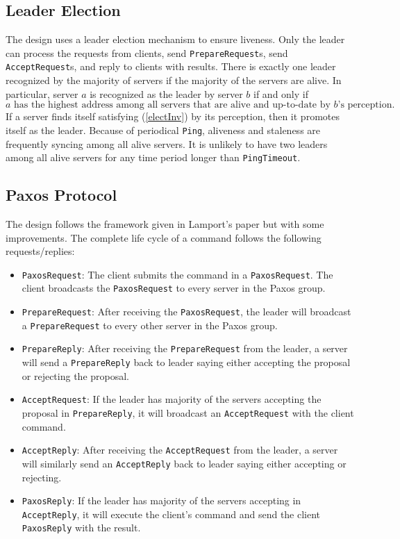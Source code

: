 \documentclass{article}
\numberwithin{equation}{section}
\begin{document}
\subsection{Leader Election}
The design uses a leader election mechanism to ensure liveness. Only the leader can process the requests from clients, send \verb|PrepareRequest|s, send \verb|AcceptRequest|s, and reply to clients with results. There is exactly one leader recognized by the majority of servers if the majority of the servers are alive. In particular, server $a$ is recognized as the leader by server $b$ if and only if
\begin{equation}\label{electInv}
	\text{$a$ has the highest address among all servers that are alive and up-to-date by $b$'s perception.}
\end{equation}
If a server finds itself satisfying (\ref{electInv}) by its perception, then it promotes itself as the leader. Because of periodical \verb|Ping|, aliveness and staleness are frequently syncing among all alive servers. It is unlikely to have two leaders among all alive servers for any time period longer than \verb|PingTimeout|.

\subsection{Paxos Protocol}\label{sec:paxos}
The design follows the framework given in Lamport's paper but with some improvements. The complete life cycle of a command follows the following requests/replies:
\begin{itemize}
	\item \verb|PaxosRequest|: The client submits the command in a \verb|PaxosRequest|. The client broadcasts the \verb|PaxosRequest| to every server in the Paxos group.
	\item \verb|PrepareRequest|: After receiving the \verb|PaxosRequest|, the leader will broadcast a \verb|PrepareRequest| to every other server in the Paxos group.
	\item \verb|PrepareReply|: After receiving the \verb|PrepareRequest| from the leader, a server will send a \verb|PrepareReply| back to leader saying either accepting the proposal or rejecting the proposal.
	\item \verb|AcceptRequest|: If the leader has majority of the servers accepting the proposal in \verb|PrepareReply|, it will broadcast an \verb|AcceptRequest| with the client command.
	\item \verb|AcceptReply|: After receiving the \verb|AcceptRequest| from the leader, a server will similarly send an \verb|AcceptReply| back to leader saying either accepting or rejecting.
	\item \verb|PaxosReply|: If the leader has majority of the servers accepting in \verb|AcceptReply|, it will execute the client's command and send the client \verb|PaxosReply| with the result.
\end{itemize}
\end{document}
